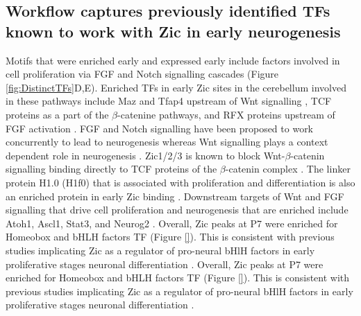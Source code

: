 \documentclass[fleqn,10pt,twocolumn]{wlscirep}
\begin{document}
\subsection*{Workflow captures previously identified TFs known to work with Zic in early neurogenesis}



Motifs that were enriched early and expressed early include factors involved in cell proliferation via FGF and Notch signalling cascades (Figure \ref{fig:DistinctTFs}D,E). Enriched TFs in early Zic sites in the cerebellum involved in these pathways include  Maz and Tfap4 upstream of Wnt signalling \cite{Martinez2020TheDevelopment, Song2018TranscriptionCarcinoma}, TCF proteins as a part of the $\beta$-catenine pathways, and RFX proteins upstream of FGF activation \cite{Hsu2010RegulationRFX1}. FGF and Notch signalling have been proposed to work concurrently to lead to neurogenesis \cite{Voelkel2014FGFHierarchy} whereas Wnt signalling plays a context dependent role in neurogenesis \cite{Lassiter2014SignalingDelamination}. Zic1/2/3 is known to block Wnt-$\beta$-catenin signalling binding directly to TCF proteins of the $\beta$-catenin complex \cite{Ge2020Zic1Transition, Fujimi2012XenopusPathway, Murgan2015AtypicalPrecursors, Pourebrahim2011TranscriptionSignaling, Aruga2018ZicDisease,Aruga2018Zic1,Lowenstein2021Olig3Development}. The linker protein H1.0 (H1f0) that is associated with proliferation and differentiation is also an enriched protein in early Zic binding \cite{DiLiegro2018H1.0Differentiation}. Downstream targets of Wnt and FGF signalling that drive cell proliferation and neurogenesis that are enriched include Atoh1, Ascl1, Stat3, and Neurog2 \cite{Dennis2019BHLHReprogramming}. Overall, Zic peaks at P7 were enriched for Homeobox and bHLH factors TF (Figure \ref{}). This is consistent with previous studies implicating Zic as a regulator of pro-neural bHlH factors in early proliferative stages neuronal differentiation \cite{Aruga2018ZicDisease}. Overall, Zic peaks at P7 were enriched for Homeobox and bHLH factors TF (Figure \ref{}). This is consistent with previous studies implicating Zic as a regulator of pro-neural bHlH factors in early proliferative stages neuronal differentiation \cite{Aruga2018ZicDisease}. 
\end{document}
